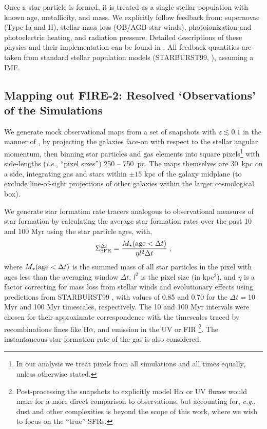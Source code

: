 \documentclass[usletter,fleqn,usenatbib]{mnras}
\newcommand{\be}{\begin{equation}}
\newcommand{\ee}{\end{equation}}
\begin{document}
Once a star particle is formed, it is treated as a single stellar population with known age, metallicity, and mass.   We explicitly follow feedback from: supernovae (Type Ia and II), stellar mass loss (OB/AGB-star winds), photoionization and photoelectric heating, and radiation pressure.  Detailed descriptions of these physics and their implementation can be found in \citet{Hopkins2018:fire}.  All feedback quantities are taken from standard stellar population models ({\scriptsize STARBURST99}, \citealt{Leitherer1999}), assuming a \citealt{Kroupa2002} IMF.


\subsection{Mapping out FIRE-2: Resolved `Observations' of the Simulations}\label{sec:maps}

We generate mock observational maps from a set of snapshots with $z\lesssim 0.1$ in the manner of \citet{Orr2018}, by  projecting the galaxies face-on with respect to the stellar angular momentum, then binning star particles and gas elements into square pixels\footnote{In our analysis we treat pixels from all simulations and all times equally, unless otherwise stated.} with side-lengths (\emph{i.e.}, ``pixel sizes'') 250 -- 750~pc.  The maps themselves are 30~kpc on a side, integrating gas and stars within $\pm 15$ kpc of the galaxy midplane (to exclude line-of-sight projections of other galaxies within the larger cosmological box).  

We generate star formation rate tracers analogous to observational measures of star formation by calculating the average star formation rates over the past 10 and 100 Myr using the star particle ages, with,
\be
\Sigma_{\rm SFR}^{\Delta t} = \frac{M_\star({\rm age} < \Delta t)}{\eta l^2 \Delta t} \; ,
\ee
where $M_\star({\rm age} < \Delta t)$ is the summed mass of all star particles in the pixel with ages less than the averaging window $\Delta t$, $l^2$ is the pixel size (in kpc$^2$), and $\eta$ is a factor correcting for mass loss from stellar winds and evolutionary effects using predictions from {\scriptsize STARBURST99} \citep{Leitherer1999}, with values of 0.85 and 0.70 for the $\Delta t =$10 Myr and 100 Myr timescales, respectively.  The 10 and 100 Myr intervals were chosen for their approximate correspondence with the timescales traced by recombinations lines like H$\alpha$, and emission in the UV or FIR \citep{Kennicutt2012}\footnote{Post-processing the snapshots to explicitly model H$\alpha$ or UV fluxes would make for a more direct comparison to observations, but accounting for, \emph{e.g.}, dust and other complexities is beyond the scope of this work, where we wish to focus on the ``true'' SFRs.}.  The instantaneous star formation rate of the gas is also considered. 
\end{document}
